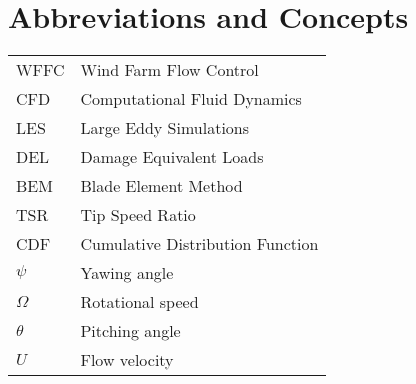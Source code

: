 \chapter*{Abbreviations and Concepts}


\begingroup
\setlength{\tabcolsep}{1pt} %
\begin{tabular}{p{3cm}l}
    WFFC \dotfill & Wind Farm Flow Control \\
    CFD \dotfill & Computational Fluid Dynamics\\
    LES \dotfill & Large Eddy Simulations\\
    DEL \dotfill & Damage Equivalent Loads\\
    BEM \dotfill & Blade Element Method\\
    TSR \dotfill & Tip Speed Ratio\\
    CDF \dotfill & Cumulative Distribution Function\\
    $\psi$ \dotfill & Yawing angle\\
    $\Omega$ \dotfill & Rotational speed\\
    $\theta$ \dotfill & Pitching angle\\
    $U$ \dotfill & Flow velocity\\

\end{tabular}
\endgroup


 